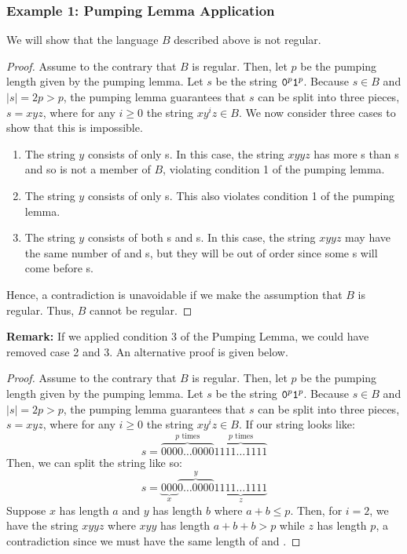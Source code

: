 \documentclass[letterpaper]{article}
\begin{document}
\subsubsection{Example 1: Pumping Lemma Application}
We will show that the language $B$ described above is not regular.

\begin{mdframed}[]
    \begin{proof}
        Assume to the contrary that $B$ is regular. Then, let $p$ be the pumping length given by the pumping lemma. Let $s$ be the string $\texttt{0}^p \texttt{1}^p$. Because $s \in B$ and $|s| = 2p > p$, the pumping lemma guarantees that $s$ can be split into three pieces, $s = xyz$, where for any $i \geq 0$ the string $xy^i z \in B$. We now consider three cases to show that this is impossible. 
        \begin{enumerate}
            \item The string $y$ consists of only s. In this case, the string $xyyz$ has more s than s and so is not a member of $B$, violating condition 1 of the pumping lemma. 
            \item The string $y$ consists of only s. This also violates condition 1 of the pumping lemma. 
            \item The string $y$ consists of both s and s. In this case, the string $xyyz$ may have the same number of  and s, but they will be out of order since some s will come before s.
        \end{enumerate}
        Hence, a contradiction is unavoidable if we make the assumption that $B$ is regular. Thus, $B$ cannot be regular. 
    \end{proof}
\end{mdframed}
\textbf{Remark:} If we applied condition 3 of the Pumping Lemma, we could have removed case 2 and 3. An alternative proof is given below. 
\begin{mdframed}[]
    \begin{proof}
        Assume to the contrary that $B$ is regular. Then, let $p$ be the pumping length given by the pumping lemma. Let $s$ be the string $\texttt{0}^p \texttt{1}^p$. Because $s \in B$ and $|s| = 2p > p$, the pumping lemma guarantees that $s$ can be split into three pieces, $s = xyz$, where for any $i \geq 0$ the string $xy^i z \in B$. If our string looks like: 
        \[s = \overbrace{0000 \dots 0000}^{p \text{ times}} \overbrace{1111 \dots 1111}^{p \text{ times}}\]
        Then, we can split the string like so: 
        \[s = \underbrace{000}_{x}\overbrace{0 \dots 0000}^{y} \underbrace{1111 \dots 1111}_{z}\]
        Suppose $x$ has length $a$ and $y$ has length $b$ where $a + b \leq p$. Then, for $i = 2$, we have the string $xyyz$ where $xyy$ has length $a + b + b > p$ while $z$ has length $p$, a contradiction since we must have the same length of  and . 
    \end{proof}
\end{mdframed}
\end{document}
